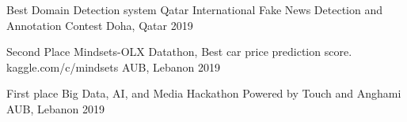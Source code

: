 \begin{cvhonors}


  \cvhonor
    {Best Domain Detection system } %
    {Qatar International Fake News Detection and Annotation Contest} %
    {Doha, Qatar} %
    {2019} %

  \cvhonor
    {Second Place} %
    {Mindsets-OLX Datathon, Best car price prediction score. kaggle.com/c/mindsets} %
    {AUB, Lebanon} %
    {2019} %

  \cvhonor
    {First place} %
    {Big Data, AI, and Media Hackathon Powered by Touch and Anghami} %
    {AUB, Lebanon} %
    {2019} %


\end{cvhonors}

